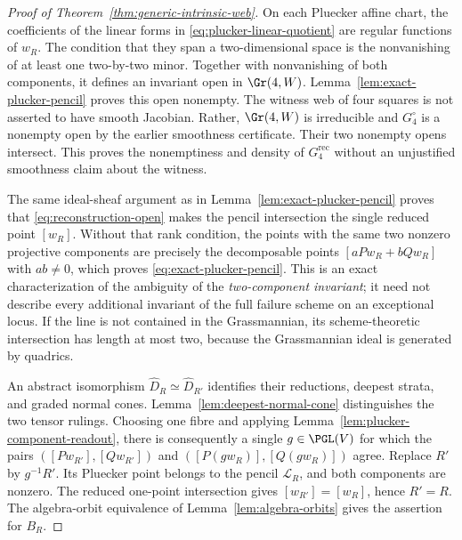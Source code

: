 \begin{proof}[Proof of Theorem~\ref{thm:generic-intrinsic-web}]
On each Pluecker affine chart, the coefficients of the linear forms
in \eqref{eq:plucker-linear-quotient} are regular functions of
\(w_R\).  The condition that they span a two-dimensional space
is the nonvanishing of at least one two-by-two minor.  Together with
nonvanishing of both components, it defines an invariant open in
\(\Gr(4,W)\).  Lemma~\ref{lem:exact-plucker-pencil} proves this
open nonempty.  The witness web of four squares is not asserted to
have smooth Jacobian.  Rather, \(\Gr(4,W)\) is irreducible and
\(G_4^\circ\) is a nonempty open by the earlier smoothness
certificate.  Their two nonempty opens intersect.  This proves the
nonemptiness and density of \(G_4^{\mathrm{rec}}\) without an
unjustified smoothness claim about the witness.

The same ideal-sheaf argument as in
Lemma~\ref{lem:exact-plucker-pencil} proves that
\eqref{eq:reconstruction-open} makes the pencil intersection the
single reduced point \([w_R]\).  Without that rank condition,
the points with the same two nonzero projective components are
precisely the decomposable points \([aPw_R+bQw_R]\) with
\(ab\ne0\), which proves \eqref{eq:exact-plucker-pencil}.
This is an exact characterization of the ambiguity of the
\emph{two-component invariant}; it need not describe every
additional invariant of the full failure scheme on an exceptional
locus.  If the line is not contained in the Grassmannian, its
scheme-theoretic intersection has length at most two, because the
Grassmannian ideal is generated by quadrics.

An abstract isomorphism \(\widehat D_R\simeq\widehat D_{R'}\)
identifies their reductions, deepest strata, and graded normal cones.
Lemma~\ref{lem:deepest-normal-cone} distinguishes the two tensor
rulings.  Choosing one fibre and applying
Lemma~\ref{lem:plucker-component-readout}, there is consequently a
single \(g\in\PGL(V)\) for which the pairs
\(([Pw_{R'}],[Qw_{R'}])\) and
\(([P(gw_R)],[Q(gw_R)])\) agree.  Replace \(R'\) by
\(g^{-1}R'\).  Its Pluecker point belongs to the pencil
\(\mathscr L_R\), and both components are nonzero.  The reduced
one-point intersection gives \([w_{R'}]=[w_R]\), hence
\(R'=R\).  The algebra-orbit equivalence of
Lemma~\ref{lem:algebra-orbits} gives the assertion for \(B_R\).
\end{proof}

